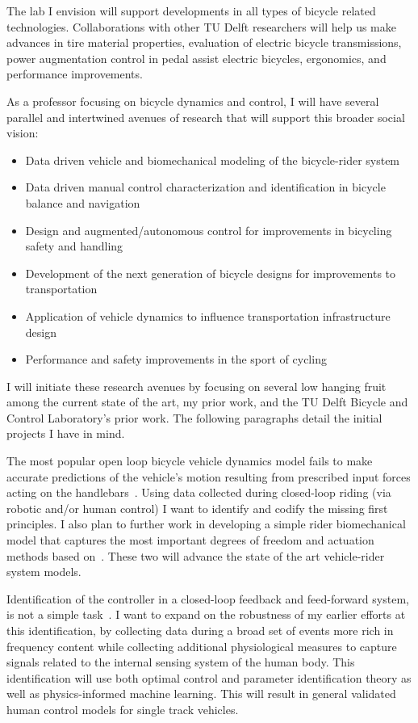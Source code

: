 \documentclass{article}
\begin{document}
The lab I envision will support developments in all types of bicycle related
technologies. Collaborations with other TU Delft researchers will help us make
advances in tire material properties, evaluation of electric bicycle
transmissions, power augmentation control in pedal assist electric bicycles,
ergonomics, and performance improvements.

As a professor focusing on bicycle dynamics and control, I will have several
parallel and intertwined avenues of research that will support this broader
social vision:
%
\begin{itemize}
  \setlength\itemsep{0.1em}
  \item Data driven vehicle and biomechanical modeling of the bicycle-rider
    system
  \item Data driven manual control characterization and identification in
    bicycle balance and navigation
  \item Design and augmented/autonomous control for improvements in bicycling
    safety and handling
  \item Development of the next generation of bicycle designs for improvements
    to transportation
  \item Application of vehicle dynamics to influence transportation
    infrastructure design
  \item Performance and safety improvements in the sport of cycling
\end{itemize}

I will initiate these research avenues by focusing on several low hanging fruit
among the current state of the art, my prior work, and the TU Delft Bicycle and
Control Laboratory's prior work. The following paragraphs detail the initial
projects I have in mind.

The most popular open loop bicycle vehicle dynamics model fails to make
accurate predictions of the vehicle's motion resulting from prescribed input
forces acting on the handlebars~\cite{Moore2013a}. Using data collected during
closed-loop riding (via robotic and/or human control) I want to identify and
codify the missing first principles. I also plan to further work in developing
a simple rider biomechanical model that captures the most important degrees of
freedom and actuation methods based on~\cite{Moore2011}. These two will advance
the state of the art vehicle-rider system models.

Identification of the controller in a closed-loop feedback and feed-forward
system, is not a simple task~\cite{vanderKooij2005}. I want to expand on the
robustness of my earlier efforts at this identification, by collecting data
during a broad set of events more rich in frequency content while collecting
additional physiological measures to capture signals related to the internal
sensing system of the human body. This identification will use both optimal
control and parameter identification theory as well as physics-informed machine
learning. This will result in general validated human control models for single
track vehicles.
\end{document}
